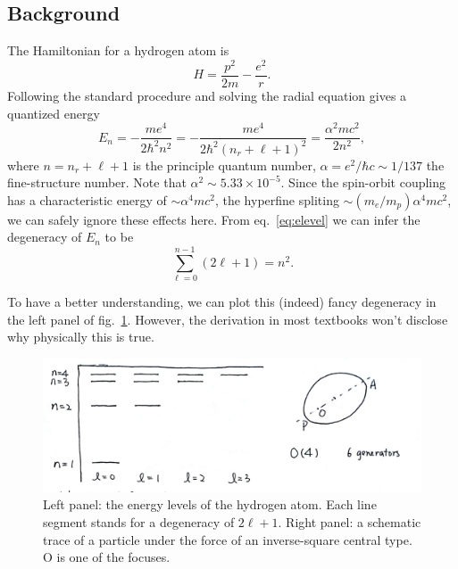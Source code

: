 \documentclass[a4paper,11pt]{article}
\theoremstyle{remark}
\theoremstyle{defn}
\begin{document}
\subsection{Background}
The Hamiltonian for a hydrogen atom is 
\begin{equation}
H = \frac{p^2}{2m}-\frac{e^2}{r}.
\end{equation}
Following the standard procedure and solving the radial equation gives a quantized energy
\begin{equation}
\label{eq:elevel}
E_n = -\frac{me^4}{2\hbar^2n^2} = -\frac{me^4}{2\hbar^2(n_r+\ell+1)^2} = \frac{\alpha^2mc^2}{2n^2},
\end{equation}
where $n=n_r+\ell+1$ is the principle quantum number, $\alpha = e^2/\hbar c\sim1/137$ the fine-structure number.
Note that $\alpha^2\sim 5.33\times 10^{-5}$. Since the spin-orbit coupling has a characteristic energy of 
$\sim \alpha^4mc^2$, the hyperfine spliting $\sim (m_e/m_p) \alpha^4mc^2$, we can safely ignore these effects here.
From eq.~\eqref{eq:elevel} we can infer the degeneracy of $E_n$ to be 
\begin{equation}
\sum_{\ell=0}^{n-1}(2\ell+1) = n^2.
\end{equation}
\par
To have a better understanding, we can plot this (indeed) fancy degeneracy in the left panel of fig.~\ref{fig:hydrogen}.
However, the derivation in most textbooks won't disclose why physically this is true.
\begin{figure}
\centering
\includegraphics[width=\linewidth]{hydrogen}
\caption{Left panel: the energy levels of the hydrogen atom. Each line segment stands for a degeneracy of $2\ell+1$. 
Right panel: a schematic trace of a particle under the force of an inverse-square central type. O is one of the focuses.}
\label{fig:hydrogen}
\end{figure}
\end{document}
